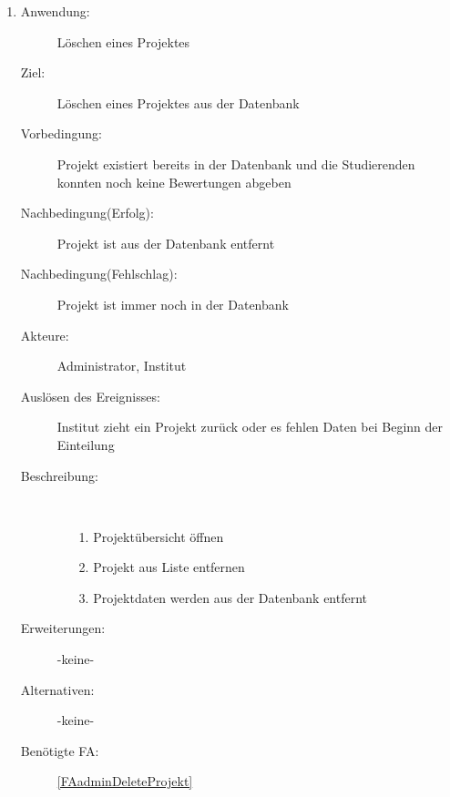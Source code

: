 \documentclass[parskip=full]{scrartcl}
\newcommand{\swtLabel}[1]{\textbf{/#1\arabic*0/}}
\begin{document}
\begin{enumerate} [label=\swtLabel{A}]
  
  \item \label{UCadminDeleteProjekt}
  \begin{description}
  \item[Anwendung:] Löschen eines Projektes
  \item[Ziel:] Löschen eines Projektes aus der Datenbank
  	\item[Vorbedingung:] Projekt existiert bereits in der Datenbank und die
  	Studierenden konnten noch keine Bewertungen abgeben
  	\item[Nachbedingung(Erfolg):] Projekt ist aus der Datenbank entfernt
  	\item[Nachbedingung(Fehlschlag):] Projekt ist immer noch in der Datenbank
  	\item[Akteure:] Administrator, Institut %
  	\item[Auslösen des Ereignisses:] Institut zieht ein Projekt zurück oder es
  	fehlen Daten bei Beginn der Einteilung
  	\item[Beschreibung:]~
  	\begin{enumerate} 
  	  \item[1.] Projektübersicht öffnen
  	  \item[2.] Projekt aus Liste entfernen
  	  \item[3.] Projektdaten werden aus der Datenbank entfernt
  	\end{enumerate}
  	\item[Erweiterungen:] -keine-
  	\item[Alternativen:] -keine-
  	\item[Benötigte FA:] \ref{FAadminDeleteProjekt}
  \end{description}
   

\end{enumerate}
\end{document}
